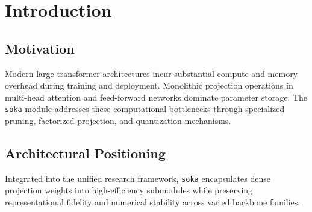 \section{Introduction}

\subsection{Motivation}
Modern large transformer architectures incur substantial compute and memory overhead during training and deployment. Monolithic projection operations in multi-head attention and feed-forward networks dominate parameter storage. The \texttt{soka} module addresses these computational bottlenecks through specialized pruning, factorized projection, and quantization mechanisms.

\subsection{Architectural Positioning}
Integrated into the unified research framework, \texttt{soka} encapsulates dense projection weights into high-efficiency submodules while preserving representational fidelity and numerical stability across varied backbone families.
